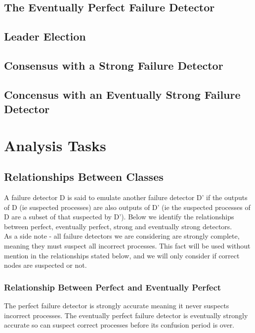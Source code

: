 \documentclass{article}
\begin{document}
\subsection{The Eventually Perfect Failure Detector}

\subsection{Leader Election}

\subsection{Consensus with a Strong Failure Detector}

\subsection{Concensus with an Eventually Strong Failure Detector}




\newpage


\section{Analysis Tasks}

\subsection{Relationships Between Classes}

A failure detector D is said to emulate another failure detector D' if the outputs of D (ie suspected processes) are also outputs of D' (ie the suspected processes of D are a subset of that suspected by D').  Below we identify the relationships between perfect, eventually perfect, strong and eventually strong detectors.\\

As a side note - all failure detectors we are considering are strongly complete, meaning they must suspect all incorrect processes.  This fact will be used without mention in the relationships stated below, and we will only consider if correct nodes are suspected or not.

\subsubsection{Relationship Between Perfect and Eventually Perfect}

The perfect failure detector is strongly accurate meaning it never suspects incorrect processes. The eventually perfect failure detector is eventually strongly accurate so can suspect correct processes before its confusion period is over.\\
\end{document}
